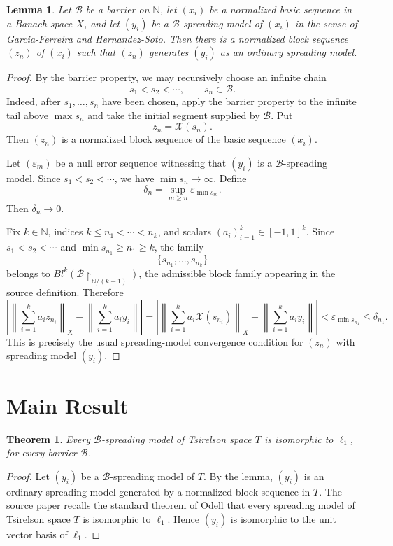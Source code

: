 \documentclass[11pt]{article}
\newtheorem{theorem}{Theorem}
\newtheorem{lemma}{Lemma}
\newcommand{\N}{\mathbb N}
\newcommand{\cB}{\mathcal B}
\newcommand{\norm}[1]{\left\lVert #1 \right\rVert}
\newcommand{\Xblock}{\mathcal X}
\begin{document}
\begin{lemma}
Let $\cB$ be a barrier on $\N$, let $(x_i)$ be a normalized basic sequence
in a Banach space $X$, and let $(y_i)$ be a $\cB$-spreading model of
$(x_i)$ in the sense of Garcia-Ferreira and Hernandez-Soto. Then there is
a normalized block sequence $(z_n)$ of $(x_i)$ such that $(z_n)$ generates
$(y_i)$ as an ordinary spreading model.
\end{lemma}

\begin{proof}
By the barrier property, we may recursively choose an infinite chain
\[
  s_1<s_2<\cdots,\qquad s_n\in\cB .
\]
Indeed, after $s_1,\ldots,s_n$ have been chosen, apply the barrier
property to the infinite tail above $\max s_n$ and take the initial
segment supplied by $\cB$. Put
\[
  z_n=\Xblock(s_n) .
\]
Then $(z_n)$ is a normalized block sequence of the basic sequence $(x_i)$.

Let $(\varepsilon_m)$ be a null error sequence witnessing that $(y_i)$ is a
$\cB$-spreading model. Since $s_1<s_2<\cdots$, we have
$\min s_n\to\infty$. Define
\[
  \delta_n=\sup_{m\ge n}\varepsilon_{\min s_m}.
\]
Then $\delta_n\to0$.

Fix $k\in\N$, indices $k\le n_1<\cdots<n_k$, and scalars
$(a_i)_{i=1}^k\in[-1,1]^k$. Since $s_1<s_2<\cdots$ and $\min s_{n_1}\ge
n_1\ge k$, the family
\[
  \{s_{n_1},\ldots,s_{n_k}\}
\]
belongs to $Bl^k(\cB\upharpoonright_{\N/(k-1)})$, the admissible block
family appearing in the source definition. Therefore
\[
  \left|
    \norm{\sum_{i=1}^k a_i z_{n_i}}_X
    -
    \norm{\sum_{i=1}^k a_i y_i}
  \right|
  =
  \left|
    \norm{\sum_{i=1}^k a_i\Xblock(s_{n_i})}_X
    -
    \norm{\sum_{i=1}^k a_i y_i}
  \right|
  < \varepsilon_{\min s_{n_1}}
  \le \delta_{n_1}.
\]
This is precisely the usual spreading-model convergence condition for
$(z_n)$ with spreading model $(y_i)$.
\end{proof}

\section*{Main Result}

\begin{theorem}
Every $\cB$-spreading model of Tsirelson space $T$ is isomorphic to
$\ell_1$, for every barrier $\cB$.
\end{theorem}

\begin{proof}
Let $(y_i)$ be a $\cB$-spreading model of $T$. By the lemma, $(y_i)$ is an
ordinary spreading model generated by a normalized block sequence in $T$.
The source paper recalls the standard theorem of Odell
\cite[Theorem 3.5(3)]{OdellStability} that every spreading model of
Tsirelson space $T$ is isomorphic to $\ell_1$. Hence $(y_i)$ is isomorphic
to the unit vector basis of $\ell_1$.
\end{proof}
\end{document}
